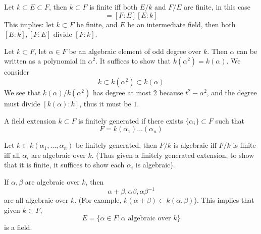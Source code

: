 \documentclass[openany]{book}
\begin{document}
\begin{prop}
    Let $k\subset E\subset F$, then $k\subset F$ is finite iff both $E/k$ and $F/E$ are finite, in this case 
    \begin{equation*}
        [F:k]=[F:E][E:k]
    \end{equation*}
    This implies: let $k\subset F$ be finite, and $E$ be an intermediate field, then both $[E:k],[F:E]$ divide $[F:k]$.
\end{prop}


\begin{example}
    Let $k\subset F$, let $\alpha\in F$ be an algebraic element of odd degree over $k$. Then $\alpha$ can be written as a polynomial in $\alpha^2$. It suffices to show that $k(\alpha^2)=k(\alpha)$. We consider 
    \begin{equation*}
        k\subset k(\alpha^2)\subset k(\alpha)
    \end{equation*}
    We see that $k(\alpha)/k(\alpha^2)$ has degree at most $2$ because $t^2-\alpha^2$, and the degree must divide $[k(\alpha):k]$, thus it must be $1$.
\end{example}


\begin{defn}
    A field extension $k\subset F$  is finitely generated if there exists $\{\alpha_i\}\subset F$ such that 
    \begin{equation*}
        F=k(\alpha_1)\dots(\alpha_n)
    \end{equation*}
\end{defn}


\begin{prop}
    Let $k\subset k(\alpha_1,\dots,\alpha_n)$ be finitely generated, then
    $F/k$ is algebraic iff $F/k$ is finite iff all $\alpha_i$ are algebraic over $k$. (Thus given a finitely generated extension, to show that it is finite, it suffices to show each $\alpha_i$ is algebraic).
\end{prop}

\begin{prop}
    If $\alpha,\beta$ are algebraic over $k$, then 
    \begin{equation*}
        \alpha+\beta, \alpha\beta, \alpha\beta^{-1}
    \end{equation*}
    are all algebraic over $k$. (For example, $k(\alpha+\beta)\subset k(\alpha,\beta)$). This implies that given $k\subset F$, 
    \begin{equation*}
        E=\{\alpha\in F: \alpha \text{ algebraic over }k \}
    \end{equation*}
    is a field.
\end{prop}
\end{document}
